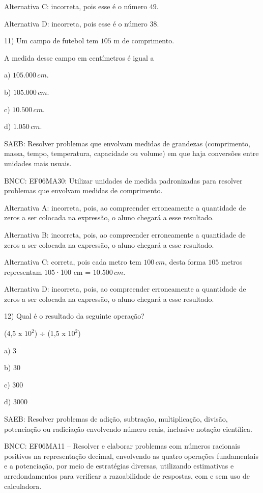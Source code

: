 Alternativa C: incorreta, pois esse é o número $49$.

Alternativa D: incorreta, pois esse é o número $38$.

11) Um campo de futebol tem $105$ m de comprimento.

A medida desse campo em centímetros é igual a

a) $105.000\,cm$.

b) $105.000\,cm$.

c) $10.500\,cm$.

d) $1.050\,cm$.

SAEB: Resolver problemas que envolvam medidas de grandezas (comprimento,
massa, tempo, temperatura, capacidade ou volume) em que haja conversões
entre unidades mais usuais.

BNCC: EF06MA30: Utilizar unidades de medida padronizadas para resolver
problemas que envolvam medidas de comprimento.

Alternativa A: incorreta, pois, ao compreender erroneamente a quantidade
de zeros a ser colocada na expressão, o aluno chegará a esse resultado.

Alternativa B: incorreta, pois, ao compreender erroneamente a quantidade
de zeros a ser colocada na expressão, o aluno chegará a esse resultado.

Alternativa C: correta, pois cada metro tem $100\,cm$, desta forma $105$
metros representam $105$·100 cm = $10.500\,cm$.

Alternativa D: incorreta, pois, ao compreender erroneamente a quantidade
de zeros a ser colocada na expressão, o aluno chegará a esse resultado.

12) Qual é o resultado da seguinte operação?

(4,5 x $10^2$) ÷ (1,5 x $10^2$)

a) $3$

b) $30$

c) $300$

d) $3000$

SAEB: Resolver problemas de adição, subtração, multiplicação, divisão,
potenciação ou radiciação envolvendo número reais, inclusive notação
científica.

BNCC: EF06MA11 -- Resolver e elaborar problemas com números racionais
positivos na representação decimal, envolvendo as quatro operações
fundamentais e a potenciação, por meio de estratégias diversas,
utilizando estimativas e arredondamentos para verificar a razoabilidade
de respostas, com e sem uso de calculadora.~

